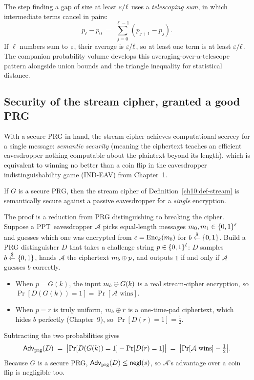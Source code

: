 \begin{connectionbox}
The step finding a gap of size at least $\eps/\ell$ uses a \emph{telescoping sum}, in which intermediate terms cancel in pairs:
\[
  p_\ell - p_0
  \;=\; \sum_{j=0}^{\ell-1} (p_{j+1} - p_j).
\]
If $\ell$ numbers sum to $\eps$, their average is $\eps/\ell$, so at least one term is at least $\eps/\ell$. The companion probability volume develops this averaging-over-a-telescope pattern alongside union bounds and the triangle inequality for statistical distance.
\end{connectionbox}

\subsection{Security of the stream cipher, granted a good PRG}
\label{ch10:cipher-security}

With a secure PRG in hand, the stream cipher achieves computational secrecy for a single message: \emph{semantic security} (meaning the ciphertext teaches an efficient eavesdropper nothing computable about the plaintext beyond its length), which is equivalent to winning no better than a coin flip in the eavesdropper indistinguishability game (IND-EAV) from Chapter~1.

\begin{theorem}
\label{ch10:thm-stream-secure}
If $G$ is a secure PRG, then the stream cipher of Definition~\ref{ch10:def-stream} is semantically secure against a passive eavesdropper for a \emph{single} encryption.
\end{theorem}

\begin{whybox}
The proof is a reduction from PRG distinguishing to breaking the cipher. Suppose a $\PPT$ eavesdropper $\mathcal{A}$ picks equal-length messages $m_0, m_1 \in \set{0,1}^\ell$ and guesses which one was encrypted from $c = \Enc_k(m_b)$ for $b \getsr \set{0,1}$. Build a PRG distinguisher $D$ that takes a challenge string $p \in \set{0,1}^\ell$: $D$ samples $b \getsr \set{0,1}$, hands $\mathcal{A}$ the ciphertext $m_b \xor p$, and outputs $1$ if and only if $\mathcal{A}$ guesses $b$ correctly.
\begin{itemize}
  \item When $p = G(k)$, the input $m_b \xor G(k)$ is a real stream-cipher encryption, so $\Pr[D(G(k)) = 1] = \Pr[\mathcal{A} \text{ wins}]$.
  \item When $p = r$ is truly uniform, $m_b \xor r$ is a one-time-pad ciphertext, which hides $b$ perfectly (Chapter~9), so $\Pr[D(r) = 1] = \tfrac12$.
\end{itemize}
Subtracting the two probabilities gives
\[
  \Adv_{\mathrm{prg}}(D)
  \;=\; \abs[\big]{\Pr[D(G(k)) = 1] - \Pr[D(r) = 1]}
  \;=\; \abs[\big]{\Pr[\mathcal{A} \text{ wins}] - \tfrac12}.
\]
Because $G$ is a secure PRG, $\Adv_{\mathrm{prg}}(D) \le \negl(s)$, so $\mathcal{A}$'s advantage over a coin flip is negligible too.
\end{whybox}

